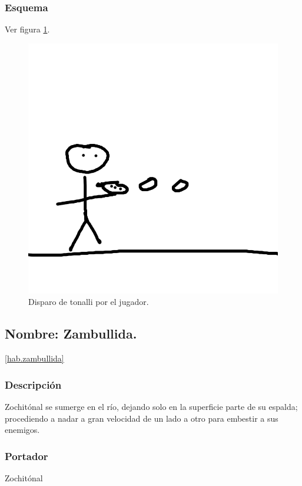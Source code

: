 \documentclass[11pt,letterpaper]{article}
\begin{document}
\subsubsection{Esquema}
			Ver figura \ref{fig:disparoT}.
			\begin{figure}
				\centering
				\includegraphics[height=0.2 \textheight]{Imagenes/disparoT}
				\caption{Disparo de tonalli por el jugador.}
				\label{fig:disparoT}
			\end{figure}
\subsection{Nombre: Zambullida.}\ref{hab.zambullida}
\subsubsection{Descripción}
Zochitónal se sumerge en el río, dejando solo en la superficie parte de su espalda; procediendo a nadar a gran velocidad de un lado a otro para embestir a sus enemigos.  
\subsubsection{Portador}
Zochitónal
\end{document}
